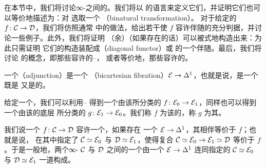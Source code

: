 \section{\trAdjunction}
\label{sec:adjunctions}

在本节中，我们将讨论∞-\trCategories{}之间的\trAdjunction{}。我们将以%
\trFibration{}的语言来定义它们，并证明它们也可以等价地描述为：对%
\trBivariant{}\trMappingSpace{}\trFunctor{}选取一个%
\trBinaturalTransformation{}（binatural transformation）。
对于给定的\trFunctor{} $f\colon \mathcal{C} \to \mathcal{D}$，我们将仿照通常\trCategoryTheory{}%
中的做法，给出若干使 $f$ 容许伴随的充分判据，并讨论一些例子。此外，我们将证明
（余）\trLimit{}（如果存在的话）可以被\trFunctor{}式地构造出来：为此只需证明
它们的构造装配成\trDiagonalFunctor{}（diagonal functor）或%
\trConstantFunctor{}的一个伴随。最后，我们将讨论\trBousfield{}\trLocalization{}%
的概念，即那些容许\trRightAdjoint{}的\trDwyer{}--\trKan{}\trLocalization{}，
或者等价地，那些容许\trFullyFaithful{}\trRightAdjoint{}的\trFunctor{}。

\begin{definition}\label{def:adjunction-infinity}
一个\emph{\trAdjunction{}}（adjunction）是一个\trBicartesianFibration{}%
（bicartesian fibration）$\mathcal{E} \to \Delta^1$，也就是说，是一个既是%
\trCartesianFibration{}又是\trCocartesianFibration{}的\trFunctor{}。
\end{definition}

\begin{definition}\label{def:left-right-adjoint}
给定一个\trAdjunction{}，我们可以利用\trStraightening{}--\trUnstraightening{}%
\trEquivalence{}得到一个由该\trCocartesianFibration{}所分类的\trFunctor{}%
$f\colon \mathcal{E}_0 \to \mathcal{E}_1$，同样也可以得到一个由该\trAdjunction{}的底层%
\trCartesianFibration{}所分类的\trFunctor{} $g\colon \mathcal{E}_1 \to \mathcal{E}_0$。我们称
$f$ 为该\trAdjunction{}的\trLeftAdjoint{}，称 $g$ 为其\trRightAdjoint{}。
\end{definition}

\begin{remark}\label{rem:admits-right-adjoint}
我们说一个\trFunctor{} $f\colon \mathcal{C} \to \mathcal{D}$ 容许一个\trRightAdjoint{}，如果存在
一个\trAdjunction{} $\mathcal{E} \to \Delta^1$，其相伴\trFunctor{}等价于 $f$；也就是说，
在其中指定了\trEquivalence{} $\mathcal{C} \simeq \mathcal{E}_0$ 与 $\mathcal{D} \simeq \mathcal{E}_1$，使得复合
$\mathcal{C} \simeq \mathcal{E}_0 \to \mathcal{E}_1 \simeq \mathcal{D}$ 等价于 $f$。于是一般地，两个∞-\trCategories{}%
$\mathcal{C}$ 与 $\mathcal{D}$ 之间的一个\trAdjunction{}由一个\trBicartesianFibration{}%
$\mathcal{E} \to \Delta^1$
连同指定的\trEquivalence{} $\mathcal{C} \simeq \mathcal{E}_0$ 与 $\mathcal{D} \simeq \mathcal{E}_1$ 一道构成。
\end{remark}

